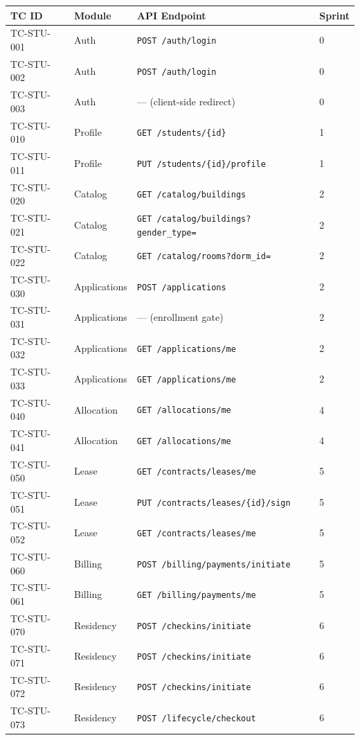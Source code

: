 \documentclass[12pt,a4paper]{article}
\begin{document}
\begin{longtable}{L{2.5cm} L{4cm} L{6cm} L{2cm}}
\toprule
\textbf{TC ID} & \textbf{Module} & \textbf{API Endpoint} & \textbf{Sprint} \\
\midrule
\endfirsthead
\midrule
\endhead
\bottomrule
\endfoot

TC-STU-001 & Auth & \texttt{POST /auth/login} & 0 \\
TC-STU-002 & Auth & \texttt{POST /auth/login} & 0 \\
TC-STU-003 & Auth & --- (client-side redirect) & 0 \\
TC-STU-010 & Profile & \texttt{GET /students/\{id\}} & 1 \\
TC-STU-011 & Profile & \texttt{PUT /students/\{id\}/profile} & 1 \\
TC-STU-020 & Catalog & \texttt{GET /catalog/buildings} & 2 \\
TC-STU-021 & Catalog & \texttt{GET /catalog/buildings?gender\_type=} & 2 \\
TC-STU-022 & Catalog & \texttt{GET /catalog/rooms?dorm\_id=} & 2 \\
TC-STU-030 & Applications & \texttt{POST /applications} & 2 \\
TC-STU-031 & Applications & --- (enrollment gate) & 2 \\
TC-STU-032 & Applications & \texttt{GET /applications/me} & 2 \\
TC-STU-033 & Applications & \texttt{GET /applications/me} & 2 \\
TC-STU-040 & Allocation & \texttt{GET /allocations/me} & 4 \\
TC-STU-041 & Allocation & \texttt{GET /allocations/me} & 4 \\
TC-STU-050 & Lease & \texttt{GET /contracts/leases/me} & 5 \\
TC-STU-051 & Lease & \texttt{PUT /contracts/leases/\{id\}/sign} & 5 \\
TC-STU-052 & Lease & \texttt{GET /contracts/leases/me} & 5 \\
TC-STU-060 & Billing & \texttt{POST /billing/payments/initiate} & 5 \\
TC-STU-061 & Billing & \texttt{GET /billing/payments/me} & 5 \\
TC-STU-070 & Residency & \texttt{POST /checkins/initiate} & 6 \\
TC-STU-071 & Residency & \texttt{POST /checkins/initiate} & 6 \\
TC-STU-072 & Residency & \texttt{POST /checkins/initiate} & 6 \\
TC-STU-073 & Residency & \texttt{POST /lifecycle/checkout} & 6 \\

\end{longtable}
\end{document}
